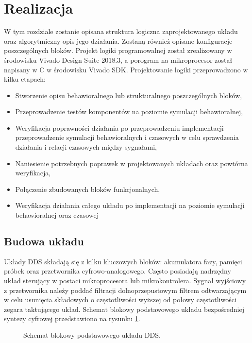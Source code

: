 \section{Realizacja}
    W tym rozdziale zostanie opisana struktura logiczna zaprojektowanego układu oraz algorytmiczny opis jego działania. 
    Zostaną również opisane konfiguracje poszczególnych bloków. Projekt logiki programowalnej został zrealizowany w środowisku 
    Vivado Design Suite 2018.3, a porogram na mikroprocesor został napisany w C w środowisku Vivado SDK. 
    Projektowanie logiki przeprowadzono w kilku etapach: 
    \begin{itemize}
        \item Stworzenie opisu behawioralnego lub strukturalnego poszczególnych bloków,
        \item Przeprowadzenie testów komponentów na poziomie symulacji behawioralnej,
        \item Weryfikacja poprawności działania po przeprowadzeniu implementacji - przeprowadzenie symulacji behawioralnych i czasowych w celu sprawdzenia działania i relacji czasowych między sygnałami,
        \item Naniesienie potrzebnych poprawek w projektowanych układach oraz powtórna weryfikacja, 
        \item Połączenie zbudowanych bloków funkcjonalnych, 
        \item Weryfikacja działania całego układu po implementacji na poziomie symulacji behawioralnej oraz czasowej
    \end{itemize}
    \subsection{Budowa układu}
        Układy DDS składają się z kilku kluczowych bloków: akumulatora fazy, pamięci próbek oraz przetwornika cyfrowo-analogowego. 
        Często posiadają nadrzędny układ sterujący w postaci mikroprocesora lub mikrokontrolera. 
        Sygnał wyjściowy z przetwornika należy poddać filtracji dolnoprzepustowym filtrem odtwarzającym w celu usunięcia składowych o częstotliwości 
        wyższej od połowy częstotliwości zegara taktującego układ. Schemat blokowy podstawowego układu bezpośredniej syntezy cyfrowej 
        przedstawiono na rysunku \ref{sch:baseDDS}.
        \begin{figure}[!ht]
            \centering
            \scalebox{1}{}
            \caption{Schemat blokowy podstawowego układu DDS.}
            \label{sch:baseDDS}
        \end{figure}
        
